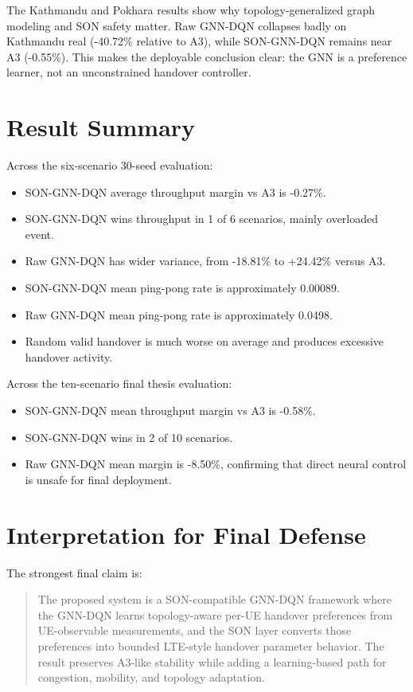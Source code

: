 \documentclass[12pt,a4paper]{report}
\begin{document}
The Kathmandu and Pokhara results show why topology-generalized graph modeling and SON safety matter. Raw GNN-DQN collapses badly on Kathmandu real (-40.72\% relative to A3), while SON-GNN-DQN remains near A3 (-0.55\%). This makes the deployable conclusion clear: the GNN is a preference learner, not an unconstrained handover controller.

\section{Result Summary}
Across the six-scenario 30-seed evaluation:

\begin{itemize}
    \item SON-GNN-DQN average throughput margin vs A3 is -0.27\%.
    \item SON-GNN-DQN wins throughput in 1 of 6 scenarios, mainly overloaded event.
    \item Raw GNN-DQN has wider variance, from -18.81\% to +24.42\% versus A3.
    \item SON-GNN-DQN mean ping-pong rate is approximately 0.00089.
    \item Raw GNN-DQN mean ping-pong rate is approximately 0.0498.
    \item Random valid handover is much worse on average and produces excessive handover activity.
\end{itemize}

Across the ten-scenario final thesis evaluation:
\begin{itemize}
    \item SON-GNN-DQN mean throughput margin vs A3 is -0.58\%.
    \item SON-GNN-DQN wins in 2 of 10 scenarios.
    \item Raw GNN-DQN mean margin is -8.50\%, confirming that direct neural control is unsafe for final deployment.
\end{itemize}

\section{Interpretation for Final Defense}
The strongest final claim is:

\begin{quote}
The proposed system is a SON-compatible GNN-DQN framework where the GNN-DQN learns topology-aware per-UE handover preferences from UE-observable measurements, and the SON layer converts those preferences into bounded LTE-style handover parameter behavior. The result preserves A3-like stability while adding a learning-based path for congestion, mobility, and topology adaptation.
\end{quote}
\end{document}
